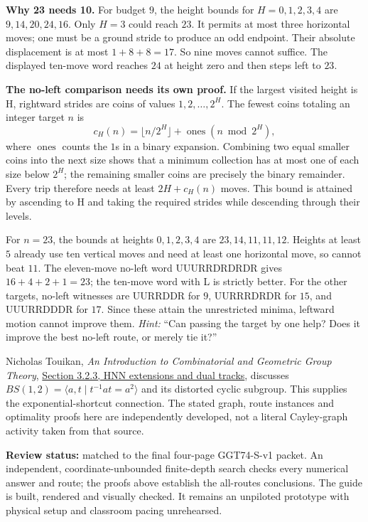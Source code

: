 \documentclass[11pt,letterpaper]{article}
\newcommand{\sect}[1]{\par\vspace{5pt}{\large\bfseries #1}\par}
\begin{document}
\textbf{Why 23 needs 10.} For budget $9$, the height bounds for
$H=0,1,2,3,4$ are $9,14,20,24,16$. Only $H=3$ could reach $23$.
It permits at most three horizontal moves; one must be a ground stride to
produce an odd endpoint. Their absolute displacement is at most $1+8+8=17$.
So nine moves cannot suffice. The displayed ten-move word reaches $24$ at
height zero and then steps left to $23$.

\textbf{The no-left comparison needs its own proof.} If the largest visited
height is H, rightward strides are coins of values $1,2,\ldots,2^H$.
The fewest coins totaling an integer target $n$ is
\[
 c_H(n)=\lfloor n/2^H\rfloor+\operatorname{ones}(n\bmod2^H),
\]
where $\operatorname{ones}$ counts the $1$s in a binary expansion. Combining
two equal smaller coins into the next size shows that a minimum collection has
at most one of each size below $2^H$; the remaining smaller coins are precisely
the binary remainder. Every trip therefore needs at least $2H+c_H(n)$ moves.
This bound is attained by ascending to H and taking the required strides while
descending through their levels.

For $n=23$, the bounds at heights $0,1,2,3,4$ are
$23,14,11,11,12$. Heights at least $5$ already use ten vertical moves and need
at least one horizontal move, so cannot beat $11$. The eleven-move no-left
word UUURRDRDRDR gives $16+4+2+1=23$; the ten-move word with L is strictly better.
For the other targets, no-left witnesses are UURRDDR for $9$,
UURRRDRDR for $15$, and UUURRDDDR for $17$. Since these attain the unrestricted
minima, leftward motion cannot improve them. \textit{Hint:} ``Can passing the
target by one help? Does it improve the best no-left route, or merely tie it?''

\sect{Source lineage and status}
Nicholas Touikan, \emph{An Introduction to Combinatorial and Geometric Group
Theory}, \href{https://ntouikan.ext.unb.ca/MATH6022/IntroCGGT/html_output/section-15.html}{Section 3.2.3, HNN extensions and dual tracks}, discusses
$BS(1,2)=\langle a,t\mid t^{-1}at=a^2\rangle$ and its distorted cyclic subgroup.
This supplies the exponential-shortcut connection. The stated graph, route
instances and optimality proofs here are independently developed, not a literal
Cayley-graph activity taken from that source.

\textbf{Review status:} matched to the final four-page GGT74-S-v1 packet.
An independent, coordinate-unbounded finite-depth search checks every numerical
answer and route; the proofs above establish the all-routes conclusions.
The guide is built, rendered and visually checked. It remains an unpiloted
prototype with physical setup and classroom pacing unrehearsed.
\end{document}
